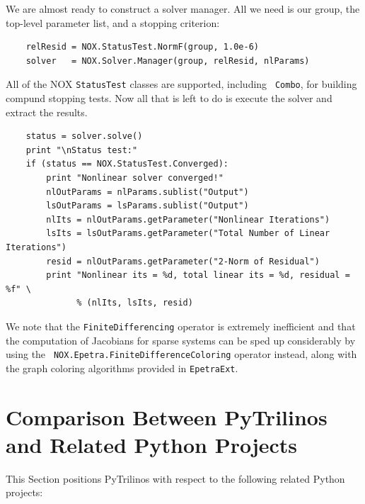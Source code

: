 \documentclass[acmtocl]{acmtrans2m}
\begin{document}
We are almost ready to construct a solver manager.  All we need is our
group, the top-level parameter list, and a stopping criterion:
\begin{verbatim}
    relResid = NOX.StatusTest.NormF(group, 1.0e-6)
    solver   = NOX.Solver.Manager(group, relResid, nlParams)
\end{verbatim}
All of the NOX {\tt StatusTest} classes are supported, including {\tt
  Combo}, for building compund stopping tests.  Now all that is left
to do is execute the solver and extract the results.
\begin{verbatim}
    status = solver.solve()
    print "\nStatus test:"
    if (status == NOX.StatusTest.Converged):
        print "Nonlinear solver converged!"
        nlOutParams = nlParams.sublist("Output")
        lsOutParams = lsParams.sublist("Output")
        nlIts = nlOutParams.getParameter("Nonlinear Iterations")
        lsIts = lsOutParams.getParameter("Total Number of Linear Iterations")
        resid = nlOutParams.getParameter("2-Norm of Residual")
        print "Nonlinear its = %d, total linear its = %d, residual = %f" \
              % (nlIts, lsIts, resid)
\end{verbatim}
We note that the {\tt FiniteDifferencing} operator is extremely
inefficient and that the computation of Jacobians for sparse systems
can be sped up considerably by using the {\tt
  NOX.Epetra.FiniteDifferenceColoring} operator instead, along with
the graph coloring algorithms provided in {\tt EpetraExt}.

\section{Comparison Between PyTrilinos and Related Python Projects}
\label{sec:comparison_python}

This Section positions PyTrilinos with respect to the following related
Python projects:
\end{document}

